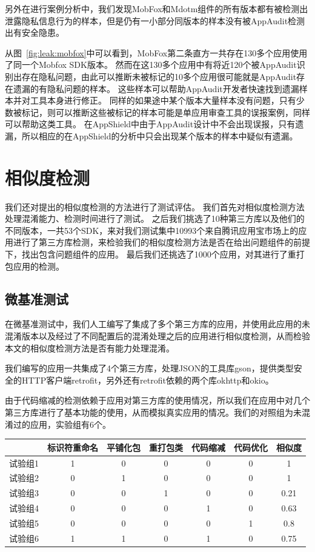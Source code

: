 另外在进行案例分析中，我们发现MobFox和Mdotm组件的所有版本都有被检测出泄露隐私信息行为的样本，但是仍有一小部分同版本的样本没有被AppAudit检测出有安全隐患。

从图~\ref{fig:leak:mobfox}中可以看到，MobFox第二条直方一共存在130多个应用使用了同一个Mobfox SDK版本。
然而在这130多个应用中有将近120个被AppAudit识别出存在隐私问题，由此可以推断未被标记的10多个应用很可能就是AppAudit存在遗漏的有隐私问题的样本。
这些样本可以帮助AppAudit开发者快速找到遗漏样本并对工具本身进行修正。
同样的如果途中某个版本大量样本没有问题，只有少数被标记，则可以推断这些被标记的样本可能是单应用审查工具的误报案例，同样可以帮助这类工具。
在AppShield中由于AppAudit设计中不会出现误报，只有遗漏，所以相应的在AppShield的分析中只会出现某个版本的样本中疑似有遗漏。

\section{相似度检测}
\label{sec:sim-eval}

我们还对提出的相似度检测的方法进行了测试评估。
我们首先对相似度检测方法处理混淆能力、检测时间进行了测试。
之后我们挑选了10种第三方库以及他们的不同版本，一共53个SDK，来对我们测试集中10993个来自腾讯应用宝市场上的应用进行了第三方库检测，来检验我们的相似度检测方法是否在给出问题组件的前提下，找出包含问题组件的应用。
最后我们还挑选了1000个应用，对其进行了重打包应用的检测。

\subsection{微基准测试}

在微基准测试中，我们人工编写了集成了多个第三方库的应用，并使用此应用的未混淆版本以及经过了不同配置后的混淆处理之后的应用进行相似度检测，从而检验本文的相似度检测方法是否有能力处理混淆。

我们编写的应用一共集成了4个第三方库，处理JSON的工具库gson，提供类型安全的HTTP客户端retrofit，另外还有retrofit依赖的两个库okhttp和okio。

由于代码缩减的检测依赖于应用对第三方库的使用情况，所以我们在应用中对几个第三方库进行了基本功能的使用，从而模拟真实应用的情况。我们的对照组为未混淆过的应用，实验组有6个。

\begin{table}
	\centering
	\begin{tabular}{|c|c|c|c|c|c|c|}
		\hline
		 & 标识符重命名 & 平铺化包 & 重打包类 & 代码缩减 & 代码优化 & 相似度\\
		\hline
		试验组1 & 1 & 0 & 0 & 0 & 0 & 1\\
		\hline
		试验组2 & 0 & 1 & 0 & 0 & 0 & 1\\
		\hline
		试验组3 & 0 & 0 & 1 & 0 & 0 & 0.21\\
		\hline
		试验组4 & 0 & 0 & 0 & 1 & 0 & 0.63\\
		\hline
		试验组5 & 0 & 0 & 0 & 0 & 1 & 0.8\\
		\hline
		试验组6 & 1 & 1 & 0 & 1 & 0 & 0.75\\
		\hline
	\end{tabular}
\end{table}


